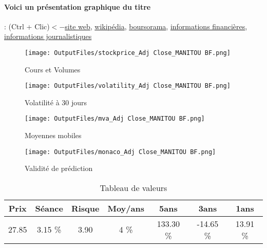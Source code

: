 \documentclass[11pt,a4paper]{report}%
\begin{document}
\paragraph{Voici un présentation graphique du titre} : (Ctrl + Clic)$<-$\href{https://www.manitou-group.com/fr/investisseurs/information-financiere/}{site web}, \href{https://fr.wikipedia.org/wiki/Manitou_Group}{wikipédia}, \href{https://www.boursorama.com/cours/1rPMTU}{boursorama}, \href{https://www.qwant.com/?q=site:https:%2f%2fwww.easybourse.com%2faction-societe%2fMANITOU-BF&t=web&client=ext-firefox-hp}{informations financières}, \href{https://bourse.lerevenu.com/cours-de-bourse/fiche-valeur-synthese/MANITOU-BF/MTU-FR}{informations journalistiques}
\begin{figure}[!htb]
   \begin{minipage}{0.5\textwidth}
     \centering
     \texttt{[image: OutputFiles/stockprice\_Adj Close\_MANITOU BF.png]}
     \caption{Cours et Volumes}\label{Fig:price_MANITOU BF}
   \end{minipage}\hfill
   \begin{minipage}{0.5\textwidth}
     \centering
     \texttt{[image: OutputFiles/volatility\_Adj Close\_MANITOU BF.png]}
     \caption{Volatilité à 30 jours}\label{Fig:volat_MANITOU BF}
   \end{minipage}
\end{figure}
\begin{figure}[!htb]
   \begin{minipage}{0.5\textwidth}
     \centering
     \texttt{[image: OutputFiles/mva\_Adj Close\_MANITOU BF.png]}
     \caption{Moyennes mobiles}\label{Fig:mva_MANITOU BF}
   \end{minipage}\hfill
   \begin{minipage}{0.5\textwidth}
     \centering
     \texttt{[image: OutputFiles/monaco\_Adj Close\_MANITOU BF.png]}
     \caption{Validité de prédiction}\label{Fig:prediction_MANITOU BF}
   \end{minipage}
\end{figure}

\begin{table}[H]
  \centering
    \begin{tabular}{|c|c|c|c|c|c|c|}
    \hline
    Prix & Séance & Risque  & Moy/ans & 5ans & 3ans & 1ans \\
    \hline
    27.85 &    3.15 \%    & 3.90 & 4 \% & 133.30 \% & -14.65 \% & 13.91 \% \\
    \hline
    \end{tabular}%
        \label{tab:table_MANITOU BF}%
      \caption{Tableau de valeurs}
\end{table}%
\end{document}
